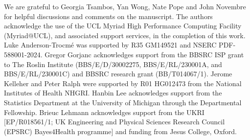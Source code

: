 
We are grateful to Georgia Tsambos, Yan Wong, Nate Pope and John Novembre
for helpful discussions and comments on the manuscript.
%
The authors acknowledge the use of the UCL Myriad High Performance Computing Facility (Myriad@UCL), and associated support services, in the completion of this work.
Luke Anderson-Trocm\'{e} was supported by R35 GM149521 and NSERC PDF-588001-2024.
%
Gregor Gorjanc acknowledges support from the BBSRC ISP grant to The Roslin Institute
(BBS/E/D/30002275, BBS/E/RL/230001A, and BBS/E/RL/230001C) and BBSRC research grant (BB/T014067/1).
%
Jerome Kelleher and Peter Ralph were supported by R01 HG012473
from the National Institutes of Health NHGRI.
%
Hanbin Lee acknowledges support from the Statistics Department at the University of Michigan through the Departmental Fellowship.
%
Brieuc Lehmann acknowledges support from the UKRI [EP/R018561/1; UK Engineering and Physical Sciences Research Council (EPSRC) Bayes4Health programme] and funding from Jesus College, Oxford.